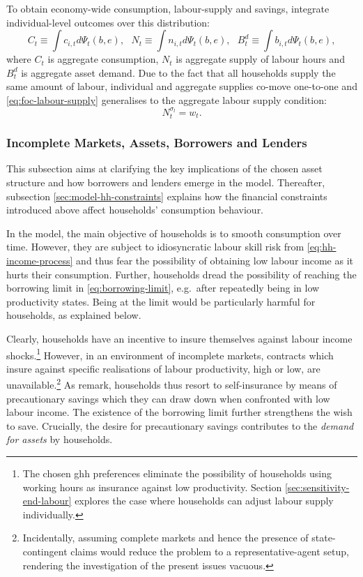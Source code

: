 \documentclass[a4paper,12pt]{article} %
\numberwithin{equation}{section} %
\numberwithin{figure}{section}
\numberwithin{table}{section}
\begin{document}
To obtain economy-wide consumption, labour-supply and savings, integrate individual-level outcomes over this distribution:
\begin{equation*}
    C_t \equiv \int c_{i,t} d \Psi_t (b,e), \ \ \ N_t \equiv \int n_{i,t} d \Psi_t (b,e), \ \ \ B_t^d \equiv \int b_{i,t} d \Psi_t (b,e), %
\end{equation*}
where $C_t$ is aggregate consumption, $N_t$ is aggregate supply of labour hours and $B_t^d$ is aggregate asset demand. Due to the fact that all households supply the same amount of labour, individual and aggregate supplies co-move one-to-one and \eqref{eq:foc-labour-supply} generalises to the aggregate labour supply condition:
\begin{equation}
    N_t^{\sigma_l} = w_t. \label{eq:hh-agg-labour-supply}
\end{equation}

\subsubsection{Incomplete Markets, Assets, Borrowers and Lenders}
\label{sec:model-hh-assets}

This subsection aims at clarifying the key implications of the chosen asset structure and how borrowers and lenders emerge in the model. Thereafter, subsection \ref{sec:model-hh-constraints} explains how the financial constraints introduced above affect households' consumption behaviour.  

In the model, the main objective of households is to smooth consumption over time. However, they are subject to idiosyncratic labour skill risk from \eqref{eq:hh-income-process} and thus fear the possibility of obtaining low labour income as it hurts their consumption. Further, households dread the possibility of reaching the borrowing limit in \eqref{eq:borrowing-limit}, e.g.~after repeatedly being in low productivity states. Being at the limit would be particularly harmful for households, as explained below.

Clearly, households have an incentive to insure themselves against labour income shocks.\footnote{The chosen \Gls{ghh} preferences eliminate the possibility of households using working hours as insurance against low productivity. Section \ref{sec:sensitivity-end-labour} explores the case where households can adjust labour supply individually.} However, in an environment of incomplete markets, contracts which insure against specific realisations of labour productivity, high or low, are unavailable.\footnote{Incidentally, assuming complete markets and hence the presence of state-contingent claims would reduce the problem to a representative-agent setup, rendering the investigation of the present issues vacuous.} As \textcite{heath2009} remark, households thus resort to self-insurance by means of precautionary savings which they can draw down when confronted with low labour income. The existence of the borrowing limit further strengthens the wish to save. Crucially, the desire for precautionary savings contributes to the \textit{demand for assets} by households. 
\end{document}

